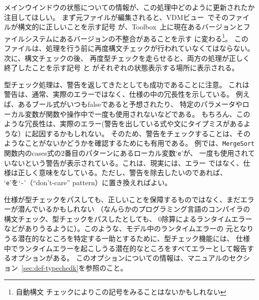 \documentclass[\pformat,12pt]{jarticle}
\newcommand{\Toolbox}{Toolbox}
\newcommand{\vdmModView}{\guicmd{VDMビュー}}
\newcommand{\guicmd}[1]{{\gt #1}}
\begin{document}
メインウインドウの状態についての情報が、この処理中どのように更新されたか注目してほしい。
まず元ファイルが編集されると、\vdmModView\ でそのファイルが構文的に正しいことを示す記号
が、\Toolbox\ 上に現在あるバージョンとファイルシステムにあるバージョンの不整合があることを示す
に変わる\footnote{自動構文
チェックによりこの記号をみることはないかもしれない}。
このファイルは、処理を行う前に再度構文チェックが行われていなくてはならない。次に、構文チェックの後、
再度型チェックを走らせると、両方の処理が正しく終了したことを示す記号
と
がそれぞれの状態表示する場所に表示される。

型チェック処理は、警告を返してきたとしても成功であることに注意。
これは警告は、通常、実際のエラーではなく、仕様の中の冗長性を示している。
例えば、あるブール式がいつもfalseであると予想されたり、
特定のパラメータやローカル変数が関数や操作中で一度も使用されないなどである。
もちろん、このような冗長性は、実際のエラー(警告を出している式や文にタイプミスがあるような）に起因するかもしれない。
そのため、警告をチェックすることは、そのようなことがないかどうかを確認するためにも有用である。
例では、{\tt MergeSort} 関数内のcases式の2番目のパターンにあるローカル変数`{\tt e}'が、
一度も使用されていないという警告が表示されている。これは、現実には、エラー
ではなく、仕様は正しく意味をなしている。ただし、警告を除去したいのであれば、
`{\tt e}'を`{\tt -}'（“don't-care” pattern）に置き換えればよい。

仕様が型チェックをパスしても、正しいことを保障するものではなく、まだエラーが潜んでいるかもしれない
（なんらかのプログラミング言語のコンパイラの構文チェック、型チェックをパスしたとしても、
0除算によるランタイムエラーなどがありうるように）。このような、モデル中のランタイムエラーの
元となりうる潜在的なところを特定する一助とするために、型チェック機能には、
仕様中でランタイムエラーを起こしうる潜在的なところをすべてエラーとして報告するオプションがある。
このオプションについての情報は、マニュアルのセクション~\ref{sec:def-typechedk}を参照のこと。
\end{document}
